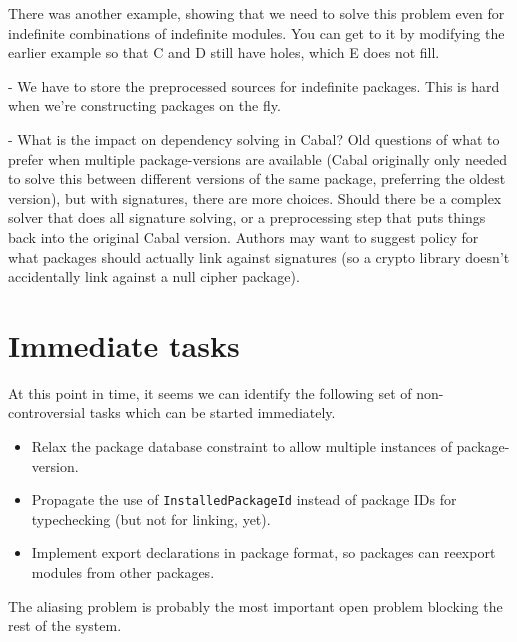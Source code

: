 \documentclass{article}
\begin{document}
      There was another example, showing that we need to solve this
      problem even for indefinite combinations of indefinite modules.
      You can get to it by modifying the earlier example so that C and
      D still have holes, which E does not fill.

    - We have to store the preprocessed sources for indefinite packages.
      This is hard when we're constructing packages on the fly.

    - What is the impact on dependency solving in Cabal?  Old questions
      of what to prefer when multiple package-versions are available
      (Cabal originally only needed to solve this between different
      versions of the same package, preferring the oldest version), but
      with signatures, there are more choices.  Should there be a
      complex solver that does all signature solving, or a preprocessing
      step that puts things back into the original Cabal version.
      Authors may want to suggest policy for what packages should actually
      link against signatures (so a crypto library doesn't accidentally
      link against a null cipher package).

\section{Immediate tasks}

At this point in time, it seems we can identify the following set
of non-controversial tasks which can be started immediately.

\begin{itemize}
    \item Relax the package database constraint to allow multiple
        instances of package-version.
    \item Propagate the use of \verb|InstalledPackageId| instead of
        package IDs for typechecking (but not for linking, yet).
    \item Implement export declarations in package format, so
        packages can reexport modules from other packages.
\end{itemize}

The aliasing problem is probably the most important open problem
blocking the rest of the system.



\end{document}
